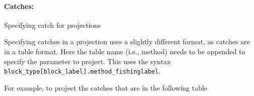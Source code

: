




\paragraph[Catches]{Catches:} Specifying catch for projections \label{sec:Project-Catch}

Specifying catches in a projection uses a slightly different format, as catches are in a table format. Here the table name (i.e., method) needs to be appended to specify the parameter to project. This uses the syntax \texttt{block\_type[block\_label].method\_fishinglabel}. 

For example, to project the  catches that are in the following table

